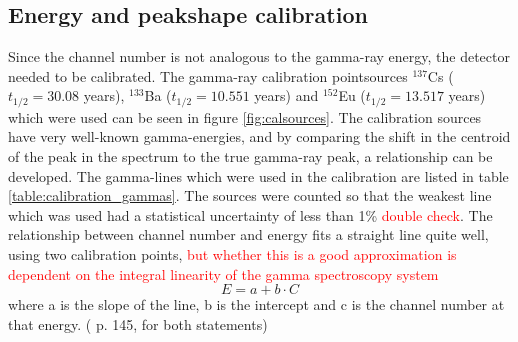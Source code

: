 \subsection{Energy and peakshape calibration}  \label{subsec:energy_peakshape_calibration}
Since the channel number is not analogous to the gamma-ray energy, the detector needed to be calibrated. The gamma-ray calibration pointsources  $^{137}$Cs ($t_{1/2}=30.08$ years\cite{Browne2007}), $^{133}$Ba ($t_{1/2}=10.551$ years\cite{Khazov2011}) and $^{152}$Eu ($t_{1/2}=13.517$ years\cite{Martin2013}) which were used can be seen in figure \ref{fig:calsources}. The calibration sources have very well-known gamma-energies, and by comparing the shift in the centroid of the peak in the spectrum to the true gamma-ray peak, a relationship can be developed. The gamma-lines which were used in the calibration are listed in table \ref{table:calibration_gammas}. The sources were counted so that the weakest line which was used had a statistical uncertainty of less than 1\% \textcolor{red}{double check}. The relationship between channel number and energy fits a straight line quite well, using two calibration points, \textcolor{red}{but whether this is a good approximation is dependent on the integral linearity of the gamma spectroscopy system} 
\begin{equation}
    E = a+b\cdot C
\end{equation}
where a is the slope of the line, b is the intercept and c is the channel number at that energy. 
(\cite{Gilmore2008} p. 145, for both statements) \\

